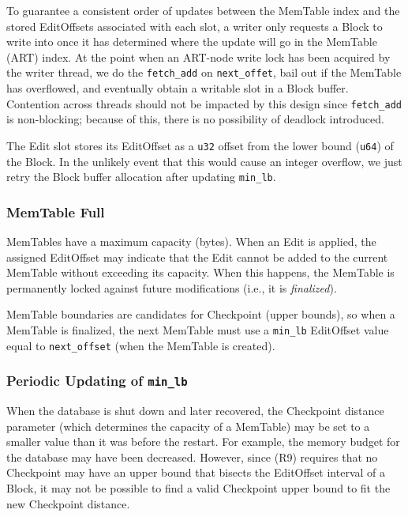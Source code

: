 \documentclass[11pt]{article}
\begin{document}
To guarantee a consistent order of updates between the MemTable index
and the stored EditOffsets associated with each slot, a writer only
requests a Block to write into once it has determined where the update
will go in the MemTable (ART) index.  At the point when an ART-node
write lock has been acquired by the writer thread, we do the
\texttt{fetch\_add} on \texttt{next\_offet}, bail out if the MemTable
has overflowed, and eventually obtain a writable slot in a Block
buffer.  Contention across threads should not be impacted by this
design since \texttt{fetch\_add} is non-blocking; because of this,
there is no possibility of deadlock introduced.

The Edit slot stores its EditOffset as a \texttt{u32} offset from the
lower bound (\texttt{u64}) of the Block.  In the unlikely event that
this would cause an integer overflow, we just retry the Block buffer
allocation after updating \texttt{min\_lb}.

\subsubsection{MemTable Full}

MemTables have a maximum capacity (bytes).  When an Edit is applied,
the assigned EditOffset may indicate that the Edit cannot be added to
the current MemTable without exceeding its capacity.  When this
happens, the MemTable is permanently locked against future
modifications (i.e., it is \textit{finalized}).

MemTable boundaries are candidates for Checkpoint (upper bounds), so
when a MemTable is finalized, the next MemTable must use a
\texttt{min\_lb} EditOffset value equal to \texttt{next\_offset} (when
the MemTable is created).

\subsubsection{Periodic Updating of \texttt{min\_lb}}\label{section:minlbrebase}

When the database is shut down and later recovered, the Checkpoint
distance parameter (which determines the capacity of a MemTable) may
be set to a smaller value than it was before the restart.  For
example, the memory budget for the database may have been decreased.
However, since (R9) requires that no Checkpoint may have an upper
bound that bisects the EditOffset interval of a Block, it may not be
possible to find a valid Checkpoint upper bound to fit the new
Checkpoint distance.
\end{document}
